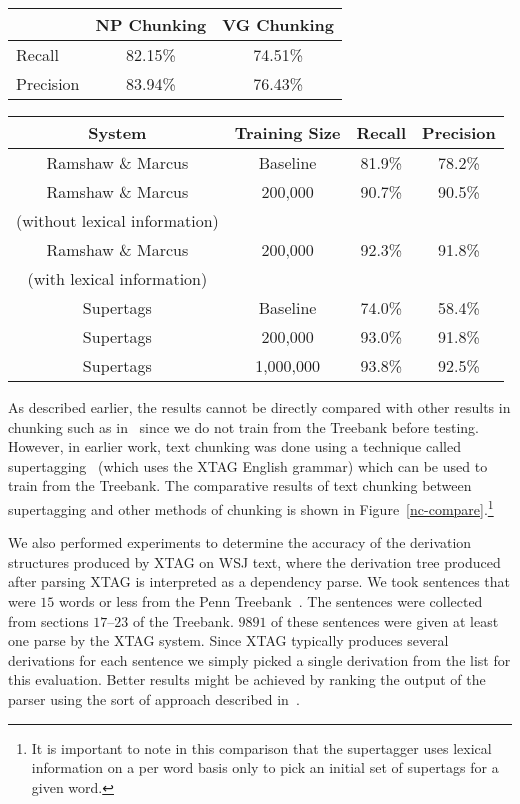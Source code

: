 \begin{table*}[htb]
\centering
\begin{tabular}{|l|c|c|}
\hline
& NP Chunking & VG Chunking \\ \hline
Recall & 82.15\% & 74.51\% \\ \hline
Precision & 83.94\%  & 76.43\% \\ \hline
\end{tabular}
\caption{Text Chunking performance of the XTAG parser}
\label{chunking-results}
\end{table*} 

\begin{table*}[htb]
\centering
\begin{tabular}{|c|c|c|c|} \hline
System & Training Size & Recall & Precision  \\ \hline \hline
Ramshaw \& Marcus & Baseline & 81.9\% & 78.2\% \\ \hline
Ramshaw \& Marcus & 200,000 & 90.7\% & 90.5\% \\ 
(without lexical information) & & & \\ \hline 
Ramshaw \& Marcus & 200,000 & 92.3\% & 91.8\% \\ 
(with lexical information) & & & \\ \hline \hline
Supertags & Baseline & 74.0\% & 58.4\% \\ \hline
Supertags & 200,000 & 93.0\% & 91.8\% \\ \hline
Supertags & 1,000,000 & 93.8\% & 92.5\% \\ \hline
\end{tabular}
\caption{Performance comparison of the transformation based noun
chunker and the supertag based noun chunker}
\label{nc-compare}
\end{table*}

As described earlier, the results cannot be directly compared with
other results in chunking such as in~\cite{lance&mitch95} since we do
not train from the Treebank before testing. However, in earlier work,
text chunking was done using a technique called
supertagging~\cite{srini97iwpt} (which uses the XTAG English grammar)
which can be used to train from the Treebank.  The comparative results
of text chunking between supertagging and other methods of chunking is
shown in Figure~\ref{nc-compare}.\footnote{It is important to note in
  this comparison that the supertagger uses lexical information on a
  per word basis only to pick an initial set of supertags for a given
  word.}

We also performed experiments to determine the accuracy of the
derivation structures produced by XTAG on WSJ text, where the
derivation tree produced after parsing XTAG is interpreted as a
dependency parse. We took sentences that were $15$ words or less from
the Penn Treebank~\cite{marcus93}. The sentences were collected from
sections $17$--$23$ of the Treebank. $9891$ of these sentences were
given at least one parse by the XTAG system. Since XTAG typically
produces several derivations for each sentence we simply picked a
single derivation from the list for this evaluation. Better results
might be achieved by ranking the output of the parser using the sort
of approach described in~\cite{srinietal95}.

